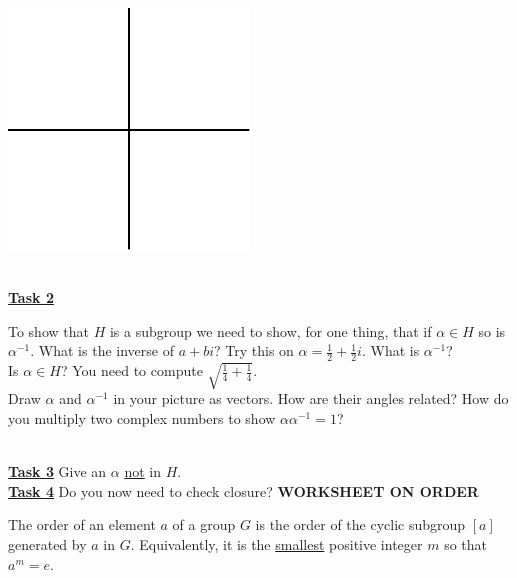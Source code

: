 \documentclass[12pt, fleqn, oneside]{book}
\begin{document}
\begin{minipage}{3in}
 \includegraphics{page_12.pdf}
\end{minipage}\\[.25in]
\underline{\bf{Task 2}} \begin{minipage}[t]{5.5in}To show that $H$ is a subgroup we need to show, for one thing, that if $\alpha \in H$ so is $\alpha^{-1}$.  What is the inverse of $a+bi$?  Try this on $\alpha = \frac12+\frac12 i$.  What is $\alpha ^{-1}$?\\[1in]
Is $\alpha \in H$?  You need to compute $\sqrt{\frac14+\frac14}$.\\[1in]
Draw $\alpha$ and $\alpha^{-1}$ in your picture as vectors.  How are their angles related?  How do you multiply two complex numbers to show $\alpha\alpha^{-1} = 1$?
\end{minipage}\\[1in]
\underline{\bf{Task 3}} Give an $\alpha$ \underline{not} in $H$.\\[1in]
\underline{\bf{Task 4}} Do you now need to check closure?
%
%
%
\clearpage
%
%
%
{\large \bf WORKSHEET ON ORDER}\\[.25in]
The order of an element $a$ of a group $G$ is the order of the cyclic subgroup $[a]$ generated by $a$ in $G$.  Equivalently, it is the \underline{smallest} positive integer $m$ so that $a^m=e$.\\[.25in]
\end{document}
